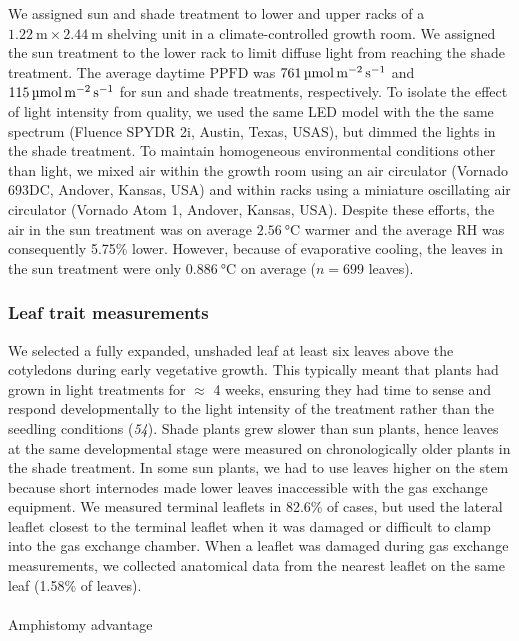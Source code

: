 \documentclass[
  letterpaper,
  DIV=11,
  numbers=noendperiod]{scrartcl}
\makeatletter
\let\oldparagraph\paragraph
\renewcommand{\paragraph}{
    \@ifstar
      \xxxParagraphStar
      \xxxParagraphNoStar
  }
\newcommand{\xxxParagraphStar}[1]{\oldparagraph*{#1}\mbox{}}
\newcommand{\xxxParagraphNoStar}[1]{\oldparagraph{#1}\mbox{}}
\newcommand{\ppfd}{$\mathrm{PPFD}$}
\newcommand{\ppfdqty}[1]{$\qty{#1}{\micro\mol\raiseto{-2}\meter\raiseto{-1}\second}$}
\makeatother
\begin{document}
We assigned sun and shade treatment to lower and upper racks of a
\(\qty{1.22}{\meter} \times \qty{2.44}{\meter}\) shelving unit in a
climate-controlled growth room. We assigned the sun treatment to the
lower rack to limit diffuse light from reaching the shade treatment. The
average daytime \ppfd{} was \ppfdqty{761} and \ppfdqty{115} for sun and
shade treatments, respectively. To isolate the effect of light intensity
from quality, we used the same LED model with the the same spectrum
(Fluence SPYDR 2i, Austin, Texas, USAS), but dimmed the lights in the
shade treatment. To maintain homogeneous environmental conditions other
than light, we mixed air within the growth room using an air circulator
(Vornado 693DC, Andover, Kansas, USA) and within racks using a miniature
oscillating air circulator (Vornado Atom 1, Andover, Kansas, USA).
Despite these efforts, the air in the sun treatment was on average
\(\qty{2.56}{\degreeCelsius}\) warmer and the average RH was
consequently 5.75\% lower. However, because of evaporative cooling, the
leaves in the sun treatment were only \(\qty{0.886}{\degreeCelsius}\) on
average (\(n = 699\) leaves).

\subsubsection{Leaf trait measurements}\label{leaf-trait-measurements}

We selected a fully expanded, unshaded leaf at least six leaves above
the cotyledons during early vegetative growth. This typically meant that
plants had grown in light treatments for \(\approx\) 4 weeks, ensuring
they had time to sense and respond developmentally to the light
intensity of the treatment rather than the seedling conditions
(\emph{54}). Shade plants grew slower than sun plants, hence leaves at
the same developmental stage were measured on chronologically older
plants in the shade treatment. In some sun plants, we had to use leaves
higher on the stem because short internodes made lower leaves
inaccessible with the gas exchange equipment. We measured terminal
leaflets in 82.6\% of cases, but used the lateral leaflet closest to the
terminal leaflet when it was damaged or difficult to clamp into the gas
exchange chamber. When a leaflet was damaged during gas exchange
measurements, we collected anatomical data from the nearest leaflet on
the same leaf (1.58\% of leaves).

\paragraph{Amphistomy advantage}\label{amphistomy-advantage}
\end{document}
